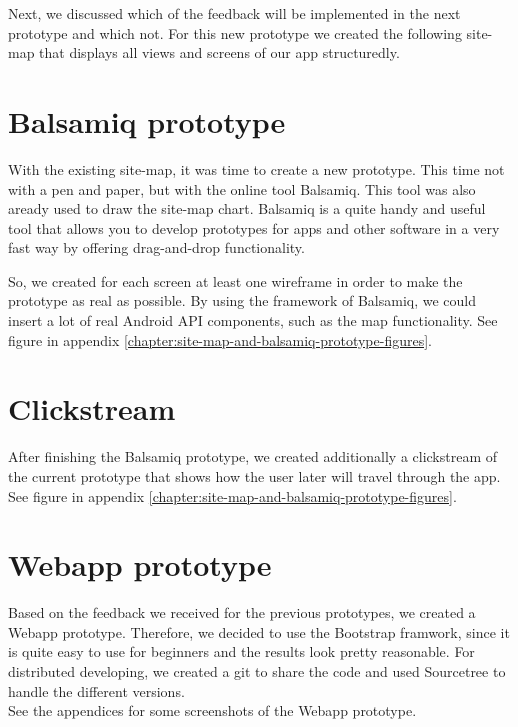 \documentclass[11pt,twoside,a4paper]{report}
\begin{document}
Next, we discussed which of the feedback will be implemented in the next prototype and which not. For this new prototype we created the following site-map that displays all views and screens of our app structuredly.

\section{Balsamiq prototype}

With the existing site-map, it was time to create a new prototype. This time not with a pen and paper, but with the online tool Balsamiq. This tool was also aready used to draw the site-map chart. Balsamiq is a quite handy and useful tool that allows you to develop prototypes for apps and other software in a very fast way by oﬀering drag-and-drop functionality.

So, we created for each screen at least one wireframe in order to make the prototype as real as possible. By using the framework of Balsamiq, we could
insert a lot of real Android API components, such as the map functionality. See figure in appendix \ref{chapter:site-map-and-balsamiq-prototype-figures}.

\section{Clickstream}

After finishing the Balsamiq prototype, we created additionally a clickstream of the current prototype that shows how the user later will travel through the app. See figure in appendix \ref{chapter:site-map-and-balsamiq-prototype-figures}.

\section{Webapp prototype}

Based on the feedback we received for the previous prototypes, we created a Webapp prototype. Therefore, we decided to use the Bootstrap framwork, since it is quite easy to use for beginners and the results look pretty reasonable. For distributed developing, we created a git to share the code and used Sourcetree to handle the different versions. 
\\See the appendices for some screenshots of the Webapp prototype.
\end{document}
